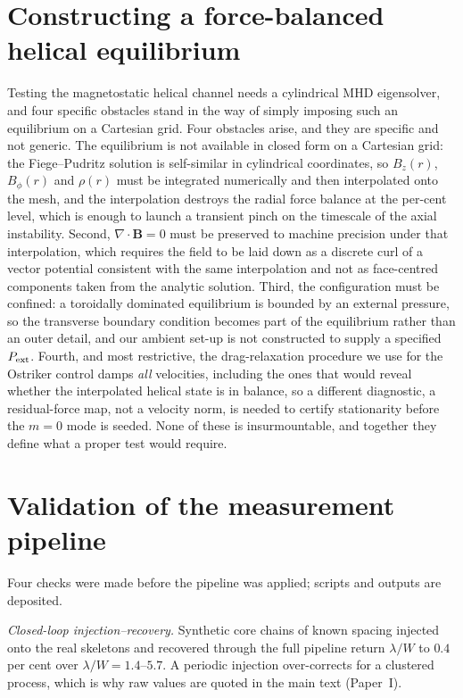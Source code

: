 \documentclass[usenatbib,twoside,twocolumn]{mnras}
\begin{document}
\section{Constructing a force-balanced helical equilibrium}
\label{sec:helical}

Testing the magnetostatic helical channel needs a cylindrical MHD eigensolver, and four specific obstacles stand in the way of simply imposing such an equilibrium on a Cartesian grid. Four obstacles arise, and they are specific and not generic. The equilibrium is not available in closed form on a Cartesian grid: the Fiege--Pudritz solution is self-similar in cylindrical coordinates, so $B_z(r)$, $B_\phi(r)$ and $\rho(r)$ must be integrated numerically and then interpolated onto the mesh, and the interpolation destroys the radial force balance at the per-cent level, which is enough to launch a transient pinch on the timescale of the axial instability. Second, $\nabla\!\cdot\!\mathbf{B}=0$ must be preserved to machine precision under that interpolation, which requires the field to be laid down as a discrete curl of a vector potential consistent with the same interpolation and not as face-centred components taken from the analytic solution. Third, the configuration must be confined: a toroidally dominated equilibrium is bounded by an external pressure, so the transverse boundary condition becomes part of the equilibrium rather than an outer detail, and our ambient set-up is not constructed to supply a specified $P_{\rm ext}$. Fourth, and most restrictive, the drag-relaxation procedure we use for the Ostriker control damps \emph{all} velocities, including the ones that would reveal whether the interpolated helical state is in balance, so a different diagnostic, a residual-force map, not a velocity norm, is needed to certify stationarity before the $m=0$ mode is seeded. None of these is insurmountable, and together they define what a proper test would require.



\section{Validation of the measurement pipeline}
\label{sec:validation}


Four checks were made before the pipeline was applied; scripts and outputs are deposited.

\emph{Closed-loop injection--recovery.} Synthetic core chains of known spacing injected onto the real skeletons and recovered through the full pipeline return $\lambda/W$ to $0.4$ per cent over $\lambda/W=1.4$--$5.7$. A periodic injection over-corrects for a clustered process, which is why raw values are quoted in the main text (Paper~I).
\end{document}
